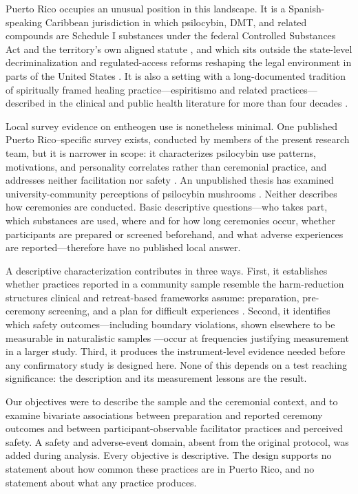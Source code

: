 \documentclass[12pt]{article}
\begin{document}
Puerto Rico occupies an unusual position in this landscape. It is a Spanish-speaking Caribbean jurisdiction
in which psilocybin, DMT, and related compounds are Schedule I substances under the federal Controlled
Substances Act \citep{uscongress1970csa} and the territory's own aligned statute \citep{pr1971csa}, and
which sits outside the state-level decriminalization and regulated-access reforms reshaping the legal
environment in parts of the United States \citep{siegel2023psychedelic}. It is also a setting with a
long-documented tradition of spiritually framed healing practice---espiritismo and related
practices---described in the clinical and public health literature for more than four decades
\citep{koss1980therapist,comasdiaz1981puertorican,bird1981sociopsychiatry,zerrate2022espiritismo}.

Local survey evidence on entheogen use is nonetheless minimal. One published Puerto Rico--specific survey
exists, conducted by members of the present research team, but it is narrower in scope: it characterizes
psilocybin use patterns, motivations, and personality correlates rather than ceremonial practice, and
addresses neither facilitation nor safety \citep{velezrodriguez2026psilocybin}. An unpublished thesis has
examined university-community perceptions of psilocybin mushrooms \citep{doeltermorales2020hongos}. Neither
describes how ceremonies are conducted. Basic descriptive questions---who takes part, which substances are
used, where and for how long ceremonies occur, whether participants are prepared or screened beforehand,
and what adverse experiences are reported---therefore have no published local answer.

A descriptive characterization contributes in three ways. First, it establishes whether practices reported
in a community sample resemble the harm-reduction structures clinical and retreat-based frameworks assume:
preparation, pre-ceremony screening, and a plan for difficult experiences
\citep{gorman2021psychedelic,pilecki2021ethical,dutton2025harm}. Second, it identifies which safety
outcomes---including boundary violations, shown elsewhere to be measurable in naturalistic samples
\citep{kruger2025psychedelic,peluso2020reflections}---occur at frequencies justifying measurement in a
larger study. Third, it produces the instrument-level evidence needed before any confirmatory study is
designed here. None of this depends on a test reaching significance: the description and its measurement
lessons are the result.

Our objectives were to describe the sample and the ceremonial context, and to examine bivariate
associations between preparation and reported ceremony outcomes and between participant-observable
facilitator practices and perceived safety. A safety and adverse-event domain, absent from the original
protocol, was added during analysis. Every objective is descriptive. The design supports no statement about
how common these practices are in Puerto Rico, and no statement about what any practice produces.
\end{document}
